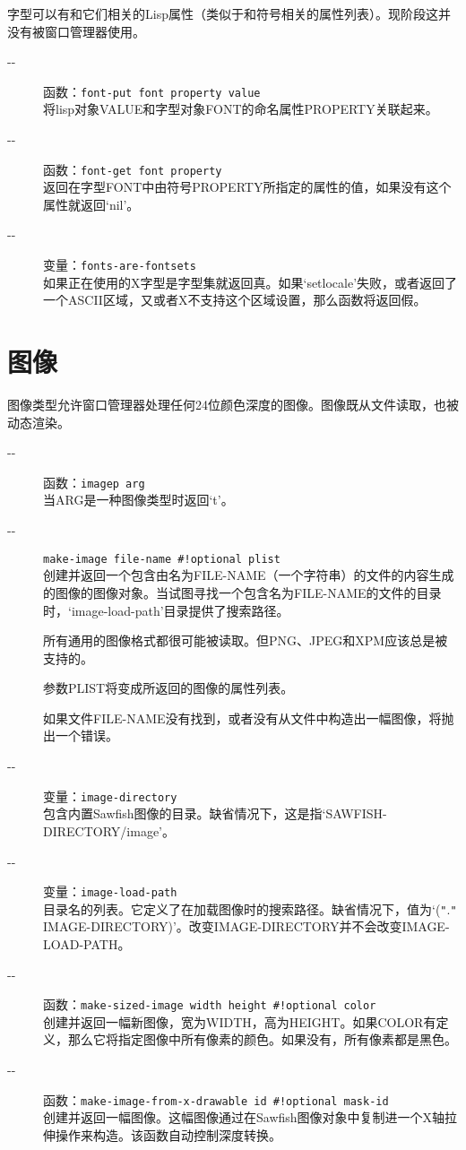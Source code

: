 \documentclass{book}
\begin{document}
\begin{CJK*}{UTF8}{gbsn}
字型可以有和它们相关的Lisp属性（类似于和符号相关的属性列表）。现阶段这并没有被窗口管理器使用。
\begin{description}
\item[-{}-] 函数：\verb|font-put font property value|\\
将lisp对象VALUE和字型对象FONT的命名属性PROPERTY关联起来。
\item[-{}-] 函数：\verb|font-get font property|\\
返回在字型FONT中由符号PROPERTY所指定的属性的值，如果没有这个属性就返回`nil'。
\item[-{}-] 变量：\verb|fonts-are-fontsets|\\
如果正在使用的X字型是字型集就返回真。如果`setlocale'失败，或者返回了一个ASCII区域，又或者X不支持这个区域设置，那么函数将返回假。
\end{description}
\chapter{图像}
图像类型允许窗口管理器处理任何24位颜色深度的图像。图像既从文件读取，也被动态渲染。
\begin{description}
\item[-{}-] 函数：\verb|imagep arg|\\
当ARG是一种图像类型时返回`t'。
\item[-{}-] \verb|make-image file-name #!optional plist|\\
创建并返回一个包含由名为FILE-NAME（一个字符串）的文件的内容生成的图像的图像对象。当试图寻找一个包含名为FILE-NAME的文件的目录时，`image-load-path'目录提供了搜索路径。

所有通用的图像格式都很可能被读取。但PNG、JPEG和XPM应该总是被支持的。

参数PLIST将变成所返回的图像的属性列表。

如果文件FILE-NAME没有找到，或者没有从文件中构造出一幅图像，将抛出一个错误。
\item[-{}-] 变量：\verb|image-directory|\\
包含内置Sawfish图像的目录。缺省情况下，这是指`SAWFISH-DIRECTORY/image'。
\item[-{}-] 变量：\verb|image-load-path|\\
目录名的列表。它定义了在加载图像时的搜索路径。缺省情况下，值为`(\verb|"|.\verb|"| IMAGE-DIRECTORY)'。改变IMAGE-DIRECTORY并不会改变IMAGE-LOAD-PATH。
\item[-{}-] 函数：\verb|make-sized-image width height #!optional color|\\
创建并返回一幅新图像，宽为WIDTH，高为HEIGHT。如果COLOR有定义，那么它将指定图像中所有像素的颜色。如果没有，所有像素都是黑色。
\item[-{}-] 函数：\verb|make-image-from-x-drawable id #!optional mask-id|\\
创建并返回一幅图像。这幅图像通过在Sawfish图像对象中复制进一个X轴拉伸操作来构造。该函数自动控制深度转换。


\end{description}
\end{CJK*}
\end{document}
